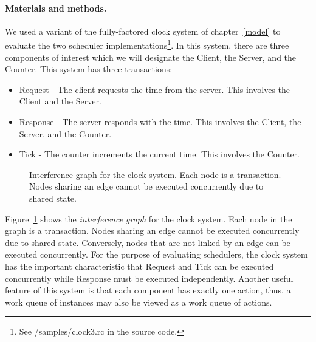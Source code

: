 \paragraph{Materials and methods.}
We used a variant of the fully-factored clock system of chapter~\ref{model} to evaluate the two scheduler implementations\footnote{See /samples/clock3.rc in the source code.}.
In this system, there are three components of interest which we will designate the Client, the Server, and the Counter.
This system has three transactions:
\begin{itemize}
  \item Request - The client requests the time from the server.  This involves the Client and the Server.
  \item Response - The server responds with the time.  This involves the Client, the Server, and the Counter.
  \item Tick - The counter increments the current time.  This involves the Counter.
\end{itemize}

\begin{figure}
\centering
{}%
\caption{Interference graph for the clock system.  Each node is a transaction.  Nodes sharing an edge cannot be executed concurrently due to shared state. \label{clock_system_mutex}}
\end{figure}

Figure~\ref{clock_system_mutex} shows the \emph{interference graph} for the clock system.
Each node in the graph is a transaction.
Nodes sharing an edge cannot be executed concurrently due to shared state.
Conversely, nodes that are not linked by an edge can be executed concurrently.
For the purpose of evaluating schedulers, the clock system has the important characteristic that Request and Tick can be executed concurrently while Response must be executed independently.
Another useful feature of this system is that each component has exactly one action, thus, a  work queue of instances may also be viewed as a work queue of actions.

